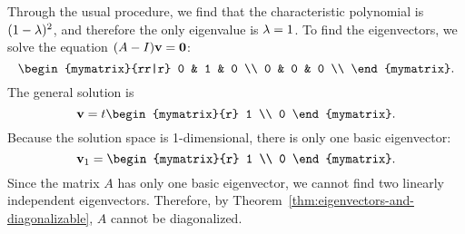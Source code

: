 \begin{solution}
  Through the usual procedure, we find that the characteristic
  polynomial is $(1-\lambda)^2$, and therefore the only eigenvalue is
  $\lambda=1$. To find the eigenvectors, we solve the equation
  $(A-I)\mbox{\bf v} = \mbox{\bf 0}$:
  \begin{equation*}
    \begin{mymatrix}{rr|r}
      0 & 1 & 0 \\
      0 & 0 & 0 \\
    \end{mymatrix}.
  \end{equation*}
  The general solution is 
  \begin{equation*}
    \vect{v} = t\begin{mymatrix}{r} 1 \\ 0 \end{mymatrix}.
  \end{equation*}
  Because the solution space is 1-dimensional, there is only one basic
  eigenvector:
  \begin{equation*}
    \vect{v}_1 = \begin{mymatrix}{r} 1 \\ 0 \end{mymatrix}.
  \end{equation*}
  Since the matrix $A$ has only one basic eigenvector, we cannot find
  two linearly independent eigenvectors. Therefore, by
  Theorem~\ref{thm:eigenvectors-and-diagonalizable}, $A$ cannot be
  diagonalized. 
\end{solution}
